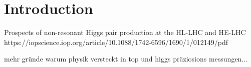 \chapter{Introduction}


Prospects of non-resonant Higgs pair production
at the HL-LHC and HE-LHC
https://iopscience.iop.org/article/10.1088/1742-6596/1690/1/012149/pdf



mehr gründe warum physik versteckt in top und higgs präziosions messungen... 